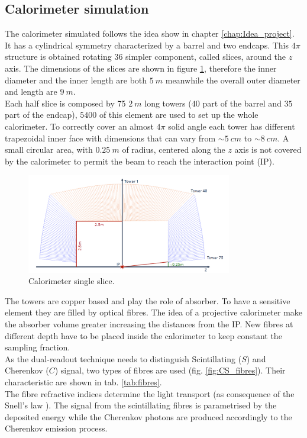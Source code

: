 \subsection{Calorimeter simulation} \label{subsec:Sim_cal}
The calorimeter simulated follows the idea show in chapter \ref{chap:Idea_project}. It has a cylindrical symmetry characterized by a barrel and two endcaps. This $4\pi$ structure is obtained rotating $36$ simpler component, called slices, around the $z$ axis. The dimensions of the slices are shown in figure \ref{fig:cal_slices}, therefore the inner diameter and  the inner length are both $5\ m$ meanwhile the overall outer diameter and length are $9\ m$.\\
Each half slice is composed by 75 $2\ m$ long towers ($40$ part of the barrel and $35$ part of the endcap), $5400$ of this element are used to set up the whole calorimeter.
To correctly cover an almost $4\pi$ solid angle each tower has different trapezoidal inner face with dimensions that can vary from $\sim 5\ cm$ to $\sim 8\ cm$.
A small circular area, with $0.25\ m$ of radius, centered along the $z$ axis is not covered by the calorimeter to permit the beam to reach the interaction point (IP).\\

\begin{figure}
	\centering
	\includegraphics[width=0.8\textwidth]{IMG/DRCGeometry1}
	\caption{Calorimeter single slice.}
	\label{fig:cal_slices}
\end{figure}

The towers are copper based and play the role of absorber. To have a sensitive element they are filled by optical fibres. The idea of a projective calorimeter make the absorber volume greater increasing the distances from the IP. New fibres at different depth have to be placed inside the calorimeter to keep constant the sampling fraction.\\
As the dual-readout technique needs to distinguish Scintillating ($S$) and Cherenkov ($C$) signal, two types of fibres are used (fig. \ref{fig:CS_fibres}). Their characteristic are shown in tab. \ref{tab:fibres}.\\
The fibre refractive indices determine the light transport (as consequence of the Snell's law \cite{Snell}). The signal from the scintillating fibres is parametrised by the deposited energy while the Cherenkov photons are produced accordingly to the Cherenkov emission process.\\

